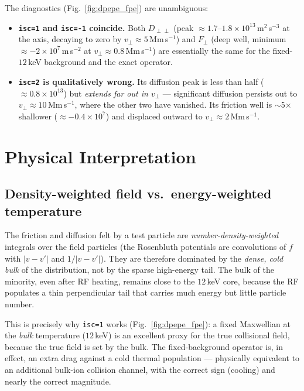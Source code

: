 \documentclass[11pt,a4paper]{article}
\begin{document}
The diagnostics (Fig.~\ref{fig:dpepe_fpe}) are unambiguous:

\begin{itemize}
  \item \textbf{\texttt{isc=1} and \texttt{isc=-1} coincide.} Both
        $D_{\perp\perp}$ (peak $\approx 1.7$--$1.8\times10^{13}$\,m$^2$\,s$^{-3}$
        at the axis, decaying to zero by $v_\perp \approx 5$\,Mm\,s$^{-1}$) and
        $F_\perp$ (deep well, minimum $\approx -2\times10^{7}$\,m\,s$^{-2}$ at
        $v_\perp \approx 0.8$\,Mm\,s$^{-1}$) are essentially the same for the
        fixed-$12$\,keV background and the exact operator.

  \item \textbf{\texttt{isc=2} is qualitatively wrong.} Its diffusion peak is
        less than half ($\approx 0.8\times10^{13}$) but \emph{extends far out
        in $v_\perp$} --- significant diffusion persists out to
        $v_\perp \approx 10$\,Mm\,s$^{-1}$, where the other two have vanished.
        Its friction well is $\sim$5$\times$ shallower
        ($\approx -0.4\times10^{7}$) and displaced outward to
        $v_\perp \approx 2$\,Mm\,s$^{-1}$.
\end{itemize}

\section{Physical Interpretation}

\subsection{Density-weighted field vs.\ energy-weighted temperature}

The friction and diffusion felt by a test particle are
\emph{number-density-weighted} integrals over the field particles (the
Rosenbluth potentials are convolutions of $f$ with $|v-v'|$ and $1/|v-v'|$).
They are therefore dominated by the \emph{dense, cold bulk} of the
distribution, not by the sparse high-energy tail. The bulk of the minority,
even after RF heating, remains close to the $12$\,keV core, because the RF
populates a thin perpendicular tail that carries much energy but little
particle number.

This is precisely why \texttt{isc=1} works (Fig.~\ref{fig:dpepe_fpe}): a fixed
Maxwellian at the \emph{bulk} temperature ($12$\,keV) is an excellent proxy
for the true collisional field, because the true field is set by the bulk. The
fixed-background operator is, in effect, an extra drag against a cold thermal
population --- physically equivalent to an additional bulk-ion collision
channel, with the correct sign (cooling) and nearly the correct magnitude.
\end{document}
